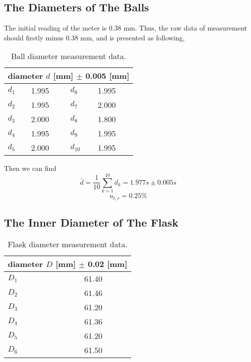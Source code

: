 \subsection{The Diameters of The Balls}

The initial reading of the meter is 0.38 mm.
Thus, the raw data of measurement should firstly minus 0.38 mm, and is presented
as following, 

\begin{table}[H]
  \centering
  \begin{tabular}{|p{2cm}|p{3cm}||p{2cm} |p{3cm} |}
    \hline
    \multicolumn{4}{|c|}{diameter $d$ [mm] $\pm$ 0.005 [mm]  } \\
    \hline
    $d_1$ & 1.995 & $d_6$ & 1.995 \\ \hline
    $d_2$ & 1.995 & $d_7$ & 2.000 \\ \hline
    $d_3$ & 2.000 & $d_8$ & 1.800 \\ \hline
    $d_4$ & 1.995 & $d_9$ & 1.995 \\ \hline
    $d_5$ & 2.000 & $d_{10}$ & 1.995 \\ \hline
  \end{tabular}
  \caption{Ball diameter measurement data.}
\end{table}

Then we can find
$$  \bar{d} = \frac{1}{10} \sum_{k=1}^{10} d_k = 1.977  s \pm  0.005 s   $$
$$  u_{t,r} =  0.25 \%  $$ 

\subsection{The Inner Diameter of The Flask}

\begin{table}[H]
  \centering
  \begin{tabular}{|p{1cm}|c|}
    \hline
    \multicolumn{2}{|c|}{diameter $D$ [mm] $\pm$ 0.02 [mm]  } \\
    \hline
    $D_1$ & 61.40 \\ \hline
    $D_2$ & 61.46 \\ \hline
    $D_3$ & 61.20 \\ \hline
    $D_4$ & 61.36 \\ \hline
    $D_5$ & 61.20 \\ \hline
    $D_6$ & 61.50 \\ \hline
  \end{tabular}
  \caption{Flask diameter measurement data.}
\end{table}


